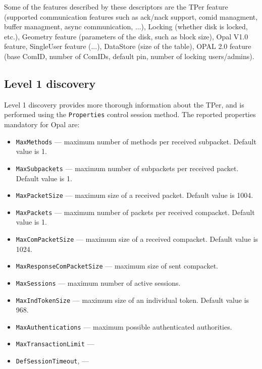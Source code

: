 Some of the features described by these descriptors are the TPer feature (supported communication features such as ack/nack support, comid managment, buffer managment, async communication, ...), Locking (whether disk is locked, etc.), Geometry feature (parameters of the disk, such as block size), Opal V1.0 feature, SingleUser feature (...), DataStore (size of the table), OPAL 2.0 feature (base ComID, number of ComIDs, default pin, number of locking users/admins).

\subsection{Level 1 discovery}

Level 1 discovery provides more thorough information about the TPer, and is performed using the \verb|Properties| control session method.
The reported properties mandatory for Opal are:
\begin{itemize}
\item \verb|MaxMethods| --- maximum number of methods per received subpacket. Default value is 1.
\item \verb|MaxSubpackets| --- maximum number of subpackets per received packet. Default value is 1.
\item \verb|MaxPacketSize| --- maximum size of a received packet. Default value is 1004.
\item \verb|MaxPackets| --- maximum number of packets per received compacket. Default value is 1.
\item \verb|MaxComPacketSize| --- maximum size of a received compacket. Default value is 1024.
\item \verb|MaxResponseComPacketSize| --- maximum size of sent compacket.
\item \verb|MaxSessions| --- maximum number of active sessions.
\item \verb|MaxIndTokenSize| --- maximum size of an individual token. Default value is 968.
\item \verb|MaxAuthentications| --- maximum possible authenticated authorities.
\item \verb|MaxTransactionLimit| --- 
\item \verb|DefSessionTimeout|, --- 
\end{itemize}

